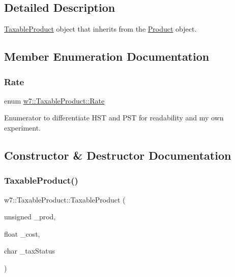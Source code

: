 \subsection{Detailed Description}
\mbox{\hyperlink{classw7_1_1TaxableProduct}{Taxable\+Product}} object that inherits from the \mbox{\hyperlink{classw7_1_1Product}{Product}} object. 

\subsection{Member Enumeration Documentation}
\mbox{\label{classw7_1_1TaxableProduct_a4685ed7e7a83db12a00c004b438e37eb}} 
\subsubsection{\texorpdfstring{Rate}{Rate}}
{\footnotesize\ttfamily enum \mbox{\hyperlink{classw7_1_1TaxableProduct_a4685ed7e7a83db12a00c004b438e37eb}{w7\+::\+Taxable\+Product\+::\+Rate}}}

Enumerator to differentiate H\+ST and P\+ST for readability and my own experiment. 

\subsection{Constructor \& Destructor Documentation}
\mbox{\label{classw7_1_1TaxableProduct_a2e4fb43aefb12ca0778fc4f0a6ffb987}} 
\subsubsection{\texorpdfstring{Taxable\+Product()}{TaxableProduct()}\hspace{0.1cm}{\footnotesize\ttfamily [1/2]}}
{\footnotesize\ttfamily w7\+::\+Taxable\+Product\+::\+Taxable\+Product (\begin{DoxyParamCaption}\item[{unsigned}]{\+\_\+prod,  }\item[{float}]{\+\_\+cost,  }\item[{char}]{\+\_\+tax\+Status }\end{DoxyParamCaption})}

